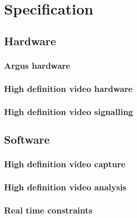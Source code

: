 
\chapter{Specification}


\section{Hardware}

\subsection{Argus hardware}

\subsection{High definition video hardware}

\subsection{High definition video signalling}

\section{Software}

\subsection{High definition video capture}

\subsection{High definition video analysis}

\subsection{Real time constraints}

